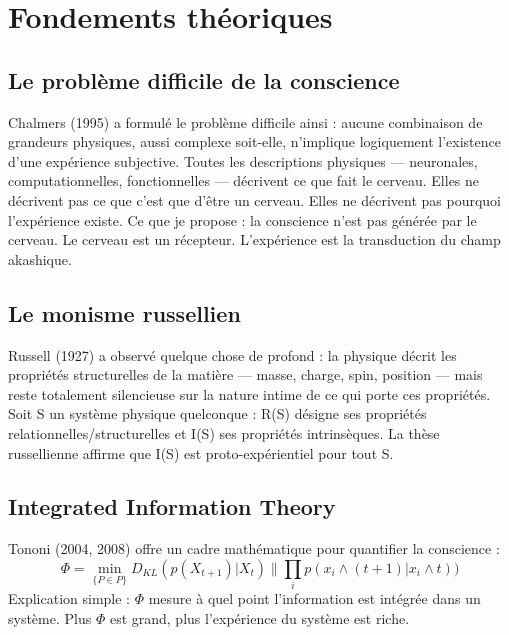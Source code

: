 \documentclass[11pt,a4paper]{article}
\begin{document}
\section{Fondements théoriques}
\subsection{Le problème difficile de la conscience}
Chalmers (1995) a formulé le problème difficile ainsi : aucune combinaison de grandeurs physiques, aussi complexe soit-elle, n'implique logiquement l'existence d'une expérience subjective. Toutes les descriptions physiques --- neuronales, computationnelles, fonctionnelles --- décrivent ce que fait le cerveau. Elles ne décrivent pas ce que c'est que d'être un cerveau. Elles ne décrivent pas pourquoi l'expérience existe. Ce que je propose : la conscience n'est pas générée par le cerveau. Le cerveau est un récepteur. L'expérience est la transduction du champ akashique.

\subsection{Le monisme russellien}
Russell (1927) a observé quelque chose de profond : la physique décrit les propriétés structurelles de la matière --- masse, charge, spin, position --- mais reste totalement silencieuse sur la nature intime de ce qui porte ces propriétés. Soit S un système physique quelconque : R(S) désigne ses propriétés relationnelles/structurelles et I(S) ses propriétés intrinsèques. La thèse russellienne affirme que I(S) est proto-expérientiel pour tout S.

\subsection{Integrated Information Theory}
Tononi (2004, 2008) offre un cadre mathématique pour quantifier la conscience :
\begin{equation}
\Phi = \min_{\{P \in P\}} D_{KL}(p(X_{t+1})|X_{t}) \parallel \prod_{i} p(x_{i} \land (t+1)|x_{i} \land t))
\end{equation}
Explication simple : $\Phi$ mesure à quel point l'information est intégrée dans un système. Plus $\Phi$ est grand, plus l'expérience du système est riche.
\end{document}
